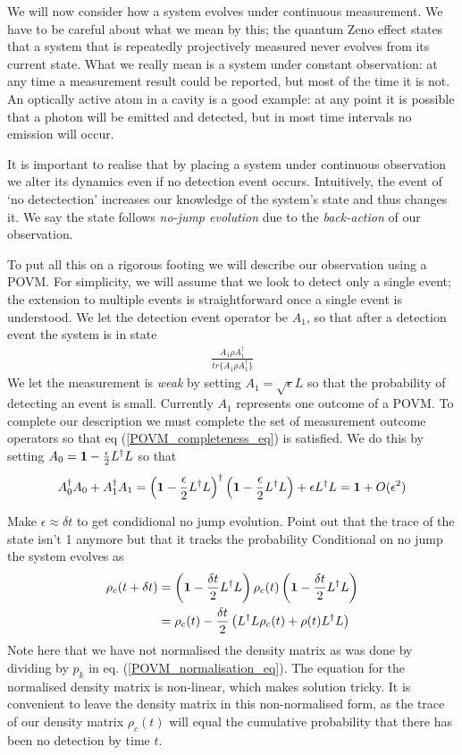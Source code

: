 We will now consider how a system evolves under continuous measurement. We have to be careful about what we mean by this; the quantum Zeno effect \cite{quantum_zeno} states that a system that is repeatedly projectively measured never evolves from its current state. What we really mean is a system under constant observation: at any time a measurement result could be reported, but most of the time it is not. An optically active atom in a cavity is a good example: at any point it is possible that a photon will be emitted and detected, but in most time intervals no emission will occur.

It is important to realise that by placing a system under continuous observation we alter its dynamics even if no detection event occurs. Intuitively, the event of `no detectection' increases our knowledge of the system's state and thus changes it. We say the state follows \textit{no-jump evolution} due to the \textit{back-action} of our observation.

To put all this on a rigorous footing we will describe our observation using a POVM. For simplicity, we will assume that we look to detect only a single  event; the extension to multiple events is straightforward once a single event is understood. We let the detection event operator be $A_1$, so that after a detection event the system is in state
\begin{align}
  \frac{A_1 \rho A_1^\dagger}{tr\{A_1 \rho A_1^\dagger\}}
\end{align}
We let the measurement is \textit{weak} by setting $A_1 = \sqrt{\epsilon} L$ so that the probability of detecting an event is small. Currently $A_1$ represents one outcome of a POVM. To complete our description we must complete the set of measurement outcome operators so that eq (\ref{POVM_completeness_eq}) is satisfied. We do this by setting $A_0 = \mathbf{1} - \frac{\epsilon}{2} L^\dagger L$ so that
\begin{align}
  A_0^\dagger A_0 + A_1^\dagger A_1 = \left( \mathbf{1} - \frac{\epsilon}{2} L^\dagger L\right)^\dagger \left( \mathbf{1} - \frac{\epsilon}{2} L^\dagger L\right) + \epsilon L^\dagger L = \mathbf{1} + O(\epsilon^2)
\end{align}

Make $\epsilon \approx \delta t$ to get condidional no jump evolution. Point out that the trace of the state isn't 1 anymore but that it tracks the probability
Conditional on no jump the system evolves as
\begin{align}
  \rho_c(t+\delta t) &= \left(\mathbf{1} - \frac{\delta t}{2} L^\dagger L\right)\rho_c(t)\left(\mathbf{1} - \frac{\delta t}{2} L^\dagger L\right) \\
  &= \rho_c(t) - \frac{\delta t}{2} \left(L^\dagger L \rho_c(t) + \rho(t) L^\dagger L \right)
\end{align}
Note here that we have not normalised the density matrix as was done by dividing by $p_k$ in eq. (\ref{POVM_normalisation_eq}). The equation for the normalised density matrix is non-linear, which makes solution tricky. It is convenient to leave the density matrix in this non-normalised form, as the trace of our density matrix $\rho_c(t)$ will equal the cumulative probability that there has been no detection by time $t$.

